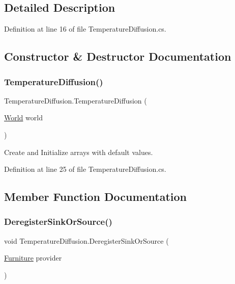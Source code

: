 \subsection{Detailed Description}


Definition at line 16 of file Temperature\+Diffusion.\+cs.



\subsection{Constructor \& Destructor Documentation}
\mbox{\label{class_temperature_diffusion_aa73aa039994d11bcd81249d843638377}} 
\subsubsection{\texorpdfstring{Temperature\+Diffusion()}{TemperatureDiffusion()}}
{\footnotesize\ttfamily Temperature\+Diffusion.\+Temperature\+Diffusion (\begin{DoxyParamCaption}\item[{\hyperlink{class_world}{World}}]{world }\end{DoxyParamCaption})}



Create and Initialize arrays with default values. 



Definition at line 25 of file Temperature\+Diffusion.\+cs.



\subsection{Member Function Documentation}
\mbox{\label{class_temperature_diffusion_a4e5af68445b339aec17d7bc33b426e47}} 
\subsubsection{\texorpdfstring{Deregister\+Sink\+Or\+Source()}{DeregisterSinkOrSource()}}
{\footnotesize\ttfamily void Temperature\+Diffusion.\+Deregister\+Sink\+Or\+Source (\begin{DoxyParamCaption}\item[{\hyperlink{class_furniture}{Furniture}}]{provider }\end{DoxyParamCaption})}



